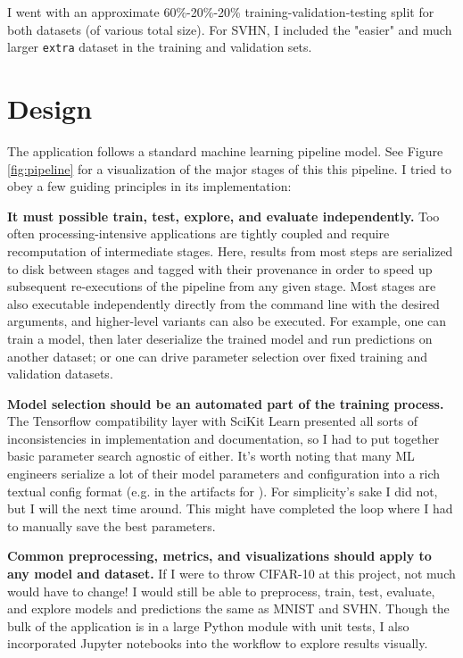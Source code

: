 \documentclass{article}
\begin{document}
I went with an approximate 60\%-20\%-20\% training-validation-testing split for both datasets (of various total size). For SVHN, I included the "easier" and much larger \texttt{extra} dataset in the training and validation sets.

\section{Design}

The application follows a standard machine learning pipeline model. See Figure \ref{fig:pipeline} for a visualization of the major stages of this this pipeline. I tried to obey a few guiding principles in its implementation: 

\textbf{It must possible train, test, explore, and evaluate independently.} Too often processing-intensive applications are tightly coupled and require recomputation of intermediate stages. Here, results from most steps are serialized to disk between stages and tagged with their provenance in order to speed up subsequent re-executions of the pipeline from any given stage. Most stages are also executable independently directly from the command line with the desired arguments, and higher-level variants can also be executed.  For example, one can train a model, then later deserialize the trained model and run predictions on another dataset; or one can drive parameter selection over fixed training and validation datasets.

\textbf{Model selection should be an automated part of the training process.} The Tensorflow \cite{tensorflow2015-whitepaper} compatibility layer with SciKit Learn \cite{scikit-learn} presented all sorts of inconsistencies in implementation and documentation, so I had to put together basic parameter search agnostic of either. It's worth noting that many ML engineers serialize a lot of their model parameters and configuration into a rich textual config format (e.g. in the artifacts for \cite{krizhevsky2012imagenet}). For simplicity's sake I did not, but I will the next time around. This might have completed the loop where I had to manually save the best parameters.

\textbf{Common preprocessing, metrics, and visualizations should apply to any model and dataset.} If I were to throw CIFAR-10 \cite{krizhevsky2009learning} at this project, not much would have to change! I would still be able to preprocess, train, test, evaluate, and explore models and predictions the same as MNIST and SVHN. Though the bulk of the application is in a large Python module with unit tests, I also incorporated Jupyter \cite{PER-GRA:2007} notebooks into the workflow to explore results visually.
\end{document}
